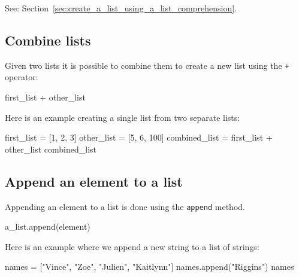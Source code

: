 See: Section~\ref{sec:create_a_list_using_a_list_comprehension}.


\subsection{Combine lists}

Given two lists it is possible to combine them to create a new list using the \texttt{+} operator:


\begin{pyin}
first_list + other_list
\end{pyin}



Here is an example creating a single list from two separate lists:




\begin{pyin}
first_list = [1, 2, 3]
other_list = [5, 6, 100]
combined_list = first_list + other_list
combined_list
\end{pyin}





\begin{raw}
[1, 2, 3, 5, 6, 100]
\end{raw}





\subsection{Append an element to a list}

Appending an element to a list is done using the \texttt{append} method.


\begin{pyin}
a_list.append(element)
\end{pyin}



Here is an example where we append a new string to a list of strings:




\begin{pyin}
names = ["Vince", "Zoe", "Julien", "Kaitlynn"]
names.append("Riggins")
names
\end{pyin}





\begin{raw}
\end{raw}

